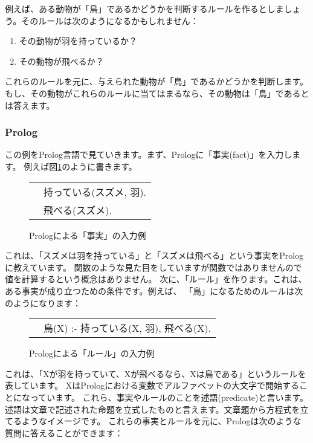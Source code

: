 \documentclass[a4j,dvipdfmx]{jsarticle}
\newcommand{\fixed}[1]{{\ttfamily #1}}
\begin{document}
例えば、ある動物が「鳥」であるかどうかを判断するルールを作るとしましょう。そのルールは次のようになるかもしれません：

\begin{enumerate}
\item その動物が羽を持っているか？
\item その動物が飛べるか？
\end{enumerate}

これらのルールを元に、与えられた動物が「鳥」であるかどうかを判断します。もし、その動物がこれらのルールに当てはまるなら、その動物は「鳥」であるとは答えます。

\subsubsection{Prolog}

この例をProlog言語で見ていきます。まず、Prologに「事実(fact)」を入力します。
例えば図\ref{fig:fact}のように書きます。
\begin{figure}[htbp]
\centering
\begin{tabular}{l}
{\fixed 　持っている(スズメ, 羽). } \\
{\fixed 　飛べる(スズメ). }
\end{tabular}
\caption{Prologによる「事実」の入力例}
\label{fig:fact}
\end{figure}

これは、「スズメは羽を持っている」と「スズメは飛べる」という事実をPrologに教えています。
関数のような見た目をしていますが関数ではありませんので値を計算するという概念はありません。
次に、「ルール」を作ります。これは、ある事実が成り立つための条件です。例えば、
「鳥」になるためのルールは次のようになります：

\begin{figure}[htbp]
\centering
\begin{tabular}{l}
{\fixed 　鳥(X) :- 持っている(X, 羽), 飛べる(X). } 
\end{tabular}
\caption{Prologによる「ルール」の入力例}
\label{fig:rule}
\end{figure}

これは、「Xが羽を持っていて、Xが飛べるなら、Xは鳥である」というルールを表しています。
XはPrologにおける変数でアルファベットの大文字で開始することになっています。
これら、事実やルールのことを述語(predicate)と言います。
述語は文章で記述された命題を立式したものと言えます。文章題から方程式を立てるようなイメージです。
これらの事実とルールを元に、Prologは次のような質問に答えることができます：
\end{document}
